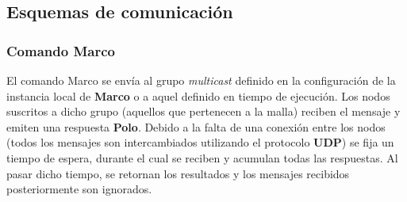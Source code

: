 \subsection{Esquemas de comunicación}

\subsubsection{Comando \textbf{Marco}}


El comando Marco se envía al grupo \textit{multicast} definido en la configuración de la instancia local de \textbf{Marco} o a aquel definido en tiempo de ejecución. Los nodos suscritos a dicho grupo (aquellos que pertenecen a la malla) reciben el mensaje y emiten una respuesta \textbf{Polo}. Debido a la falta de una conexión entre los nodos (todos los mensajes son intercambiados utilizando el protocolo \textbf{UDP}) se fija un tiempo de espera, durante el cual se reciben y acumulan todas las respuestas. Al pasar dicho tiempo, se retornan los resultados y los mensajes recibidos posteriormente son ignorados.




